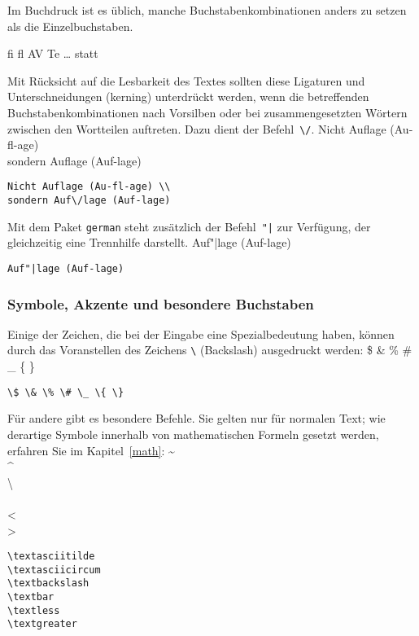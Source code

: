 Im Buchdruck ist es üblich, manche Buchstabenkombinationen
anders zu setzen als die Einzelbuchstaben.
\begin{beispiel}
{\large fi fl AV Te \dots}\quad
statt
\end{beispiel}
Mit Rücksicht auf die Lesbarkeit des Textes sollten
diese  Ligaturen und Unterschneidungen (kerning) 
unterdrückt werden, wenn die betreffenden Buchstabenkombinationen 
nach Vorsilben oder bei zusammengesetzten Wörtern zwischen den
Wortteilen auftreten.  Dazu dient der Befehl~\verb|\/|.
\exa
Nicht Auflage (Au-fl-age) \\
sondern Auf\/lage (Auf-lage)
\exb
\begin{verbatim}
Nicht Auflage (Au-fl-age) \\
sondern Auf\/lage (Auf-lage)
\end{verbatim}
\exc
Mit dem Paket \texttt{german} steht zusätzlich der
Befehl~\verb:"|: zur Verfügung, der gleichzeitig eine
Trennhilfe darstellt.
\exa
Auf"|lage (Auf-lage)
\exb
\begin{verbatim}
Auf"|lage (Auf-lage)
\end{verbatim}
\exc

\subsubsection{Symbole, Akzente und besondere Buchstaben}\label{symbole}

Einige der Zeichen, die bei der Eingabe eine Spezialbedeutung haben,
können durch das Voranstellen des
Zeichens \verb|\| (Backslash) ausgedruckt werden:
\exa
\$ \& \% \# \_ \{ \}
\exb
\begin{verbatim}
\$ \& \% \# \_ \{ \}
\end{verbatim}
\exc
Für andere gibt es besondere Befehle.  Sie gelten nur für normalen
Text; wie derartige Symbole innerhalb von mathematischen
Formeln gesetzt werden, erfahren Sie im Kapitel~\ref{math}:
\exa
\textasciitilde \\
\textasciicircum \\
\textbackslash \\
\textbar \\ 
\textless\\
\textgreater
\exb
\begin{verbatim}
\textasciitilde
\textasciicircum
\textbackslash 
\textbar  
\textless  
\textgreater
\end{verbatim}
\exc

